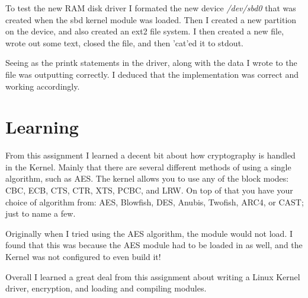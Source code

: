 \documentclass[letterpaper,10pt,titlepage]{article}
\begin{document}
To test the new RAM disk driver I formated the new device
\emph{/dev/sbd0} that
was created when the sbd kernel module was loaded. Then I created a new
partition on the device, and also created an ext2 file system. I then
created a new file, wrote out some text, closed the file, and then
'cat'ed it to stdout. 

Seeing as the printk statements in the driver, along with the data I
wrote to the file was outputting correctly. I deduced that the
implementation was correct and working accordingly.

\section*{Learning}

From this assignment I learned a decent bit about how cryptography is
handled in the Kernel. Mainly that there are several different methods
of using a single algorithm, such as AES. The kernel allows you to use
any of the block modes: CBC, ECB, CTS, CTR, XTS, PCBC, and LRW. On top
of that you have your choice of algorithm from: AES, Blowfish, DES,
Anubis, Twofish, ARC4, or CAST; just to name a few.

Originally when I tried using the AES algorithm, the module would not
load. I found that this was because the AES module had to be loaded in
as well, and the Kernel was not configured to even build it!

Overall I learned a great deal from this assignment about writing a
Linux Kernel driver, encryption, and loading and compiling modules.
\end{document}
